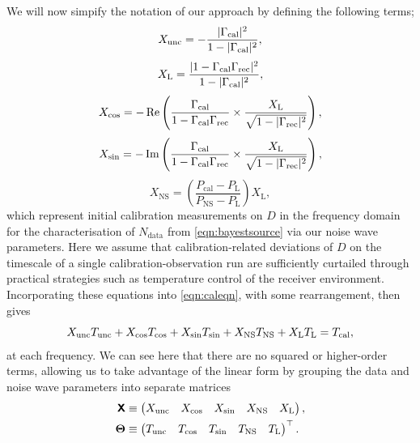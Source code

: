 We will now simpify the notation of our approach by defining the following terms;
\begin{equation}\label{eqn:xunc}
    X_{\mathrm{unc}} = -\frac{|\Gamma_{\mathrm{cal}}|^2}{ 1-|\Gamma_{\mathrm{cal}}|^2}, 
\end{equation}
\begin{equation}\label{eqn:xl}
    X_{\mathrm{L}} = \frac{|1-\Gamma_{\mathrm{cal}}\Gamma_{\mathrm{rec}}|^2}{1-|\Gamma_{\mathrm{cal}}|^2},
\end{equation}
\begin{equation}\label{eqn:xcos}
    X_{\mathrm{cos}} = -\operatorname{Re}\left(\frac{\Gamma_{\mathrm{cal}}}{1-\Gamma_{\mathrm{cal}}\Gamma_{\mathrm{rec}}} \times \frac{X_{\mathrm{L}}}{\sqrt{1-|\Gamma_{\mathrm{rec}}|^2}}\right),
\end{equation}
\begin{equation}\label{eqn:xsin}
    X_{\mathrm{sin}} = -\operatorname{Im}\left(\frac{\Gamma_{\mathrm{cal}}}{1-\Gamma_{\mathrm{cal}}\Gamma_{\mathrm{rec}}} \times \frac{X_{\mathrm{L}}}{\sqrt{1-|\Gamma_{\mathrm{rec}}|^2}}\right),
\end{equation}
\begin{equation}\label{eqn:xns}
    X_{\mathrm{NS}} = \left( \frac{P_{\mathrm{cal}}-P_{\mathrm{L}}}{P_{\mathrm{NS}}-P_{\mathrm{L}}} \right) X_{\mathrm{L}},
\end{equation}
which represent initial calibration measurements on $D$ in the frequency domain for the characterisation of $N_{\mathrm{data}}$ from \cref{eqn:bayestsource} via our noise wave parameters. Here we assume that calibration-related deviations of $D$ on the timescale of a single calibration-observation run are sufficiently curtailed through practical strategies such as temperature control of the receiver environment. Incorporating these equations into \cref{eqn:caleqn}, with some rearrangement, then gives
\begin{equation}
    X_{\mathrm{unc}}T_{\mathrm{unc}} + X_{\mathrm{cos}}T_{\mathrm{cos}} + X_{\mathrm{sin}}T_{\mathrm{sin}} + X_{\mathrm{NS}}T_{\mathrm{NS}} + X_{\mathrm{L}}T_{\mathrm{L}} = T_{\mathrm{cal}},
    \label{eqn:almost_expanded_cal_eqn}
\end{equation}
at each frequency. We can see here that there are no squared or higher-order terms, allowing us to take advantage of the linear form by grouping the data and noise wave parameters into separate matrices
\begin{equation} \label{eqn:theta}
    \begin{split}
    \textbf{\textsf{X}} &\equiv \begin{pmatrix} 
        X_\mathrm{unc} \quad 
        X_\mathrm{cos} \quad
        X_\mathrm{sin} \quad
        X_\mathrm{NS} \quad
        X_\mathrm{L} \end{pmatrix}, \\
    \boldsymbol{\Theta} &\equiv \begin{pmatrix} 
        T_\mathrm{unc}\quad
        T_\mathrm{cos}\quad
        T_\mathrm{sin}\quad
        T_\mathrm{NS}\quad
        T_\mathrm{L}\end{pmatrix}^\top.
    \end{split}
\end{equation}

